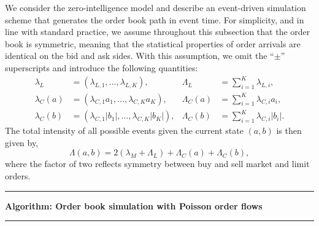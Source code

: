 We consider the zero-intelligence model and describe an event-driven
simulation scheme that generates the order book path in event time. For simplicity, and in
line with standard practice, we assume throughout this subsection that the order book is
symmetric, meaning that the statistical properties of order arrivals are identical on the bid
and ask sides. With this assumption, we omit the ``$\pm$'' superscripts and introduce the
following quantities:
\begin{align*}
\lambda_L &= (\lambda_{L,1}, \ldots, \lambda_{L,K}), 
&\Lambda_L &= \sum_{i=1}^K \lambda_{L,i}, \\[4pt]
\lambda_C(a) &= (\lambda_{C,1} a_1, \ldots, \lambda_{C,K} a_K),
&\Lambda_C(a) &= \sum_{i=1}^K \lambda_{C,i} a_i, \\[4pt]
\lambda_C(b) &= (\lambda_{C,1} |b_1|, \ldots, \lambda_{C,K} |b_K|),
&\Lambda_C(b) &= \sum_{i=1}^K \lambda_{C,i} |b_i|.
\end{align*}
The total intensity of all possible events given the current state $(a,b)$ is then given by, 
\begin{equation}
\Lambda(a,b) = 2(\lambda_M + \Lambda_L) + \Lambda_C(a) + \Lambda_C(b),
\end{equation}
where the factor of two reflects symmetry between buy and sell market and limit orders.


\noindent\rule{\textwidth}{0.4pt}
\noindent\textbf{Algorithm: Order book simulation with Poisson order flows}

\vspace{-4mm}
\noindent\rule{\textwidth}{0.4pt}

